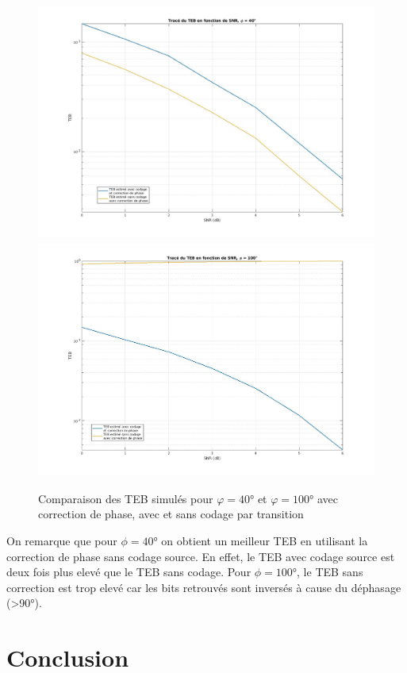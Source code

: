 \documentclass[11pt,a4paper]{report}
\begin{document}
\begin{figure}[H]
    \centering
    \includegraphics[height=7.8cm]{Screenshots/4_2_1.jpg}
    \includegraphics[height=7.8cm]{Screenshots/4_2_2.jpg}
    \caption{Comparaison des TEB simulés pour $\varphi = 40$° et $\varphi = 100$° avec correction de phase, avec et sans codage par transition}
    \label{fig:un_label} 
\end{figure}

On remarque que pour $\phi = 40$° on obtient un meilleur TEB en utilisant la correction de phase sans codage source. En effet, le TEB avec codage source est deux fois plus elevé que le TEB sans codage. Pour $\phi = 100$°, le TEB sans correction est trop elevé car les bits retrouvés sont inversés à cause du déphasage (>90°).

\part{Conclusion}
\fancyhead[C]{\nouppercase{\leftmark}}
\renewcommand\thesection{\arabic{section}}
\end{document}
